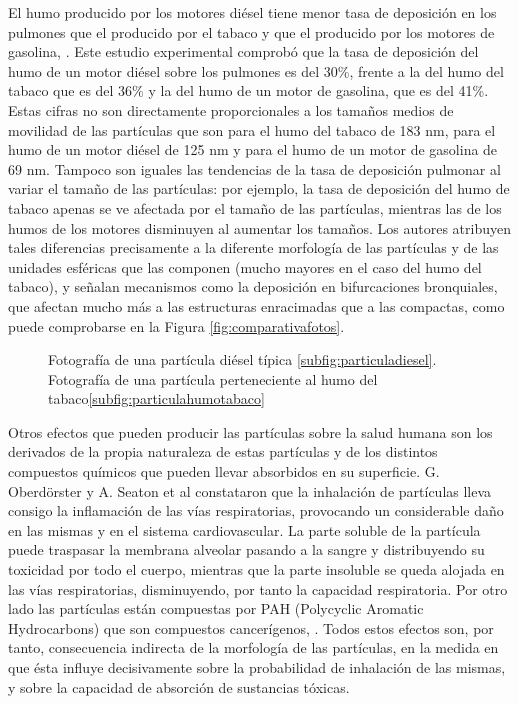 \par El humo producido por los motores diésel tiene menor tasa de deposición en los pulmones que el producido por el tabaco y que el producido por los motores de gasolina, \cite{morawskaetal:1998}. Este estudio experimental comprobó que la tasa de deposición del humo de un motor diésel sobre los pulmones es del 30\%, frente a la del humo del tabaco que es del 36\% y la del humo de un motor de gasolina, que es del 41\%. Estas cifras no son directamente proporcionales a los tamaños medios de movilidad de las partículas que son para el humo del tabaco de 183 nm, para el humo de un motor diésel de 125 nm y para el humo de un motor de gasolina de 69 nm. Tampoco son iguales las tendencias de la tasa de deposición pulmonar al variar el tamaño de las partículas: por ejemplo, la tasa de deposición del humo de tabaco apenas se ve afectada por el tamaño de las partículas, mientras las de los humos de los motores disminuyen al aumentar los tamaños. Los autores atribuyen tales diferencias precisamente a la diferente morfología de las partículas y de las unidades esféricas que las componen (mucho mayores en el caso del humo del tabaco), y señalan mecanismos como la deposición en bifurcaciones bronquiales, que afectan mucho más a las estructuras enracimadas que a las compactas, como puede comprobarse en la Figura \ref{fig:comparativafotos}.
  
\begin{figure}[ht]
\centering
	 \qquad
	 \caption{Fotografía de una partícula diésel típica \ref{subfig:particuladiesel}. Fotografía de una partícula perteneciente al humo del tabaco\ref{subfig:particulahumotabaco}}
\end{figure} \label{fig:comparativafotos}

\par Otros efectos que pueden producir las partículas sobre la salud humana son los derivados de la propia naturaleza de estas partículas y de los distintos compuestos químicos que pueden llevar absorbidos en su superficie. G. Oberdörster \cite{oberdoster:2001} y A. Seaton et al \cite{seatonetal:1995} constataron que la inhalación de partículas lleva consigo la inflamación de las vías respiratorias, provocando un considerable daño en las mismas y en el sistema cardiovascular. La parte soluble de la partícula puede traspasar la membrana alveolar pasando a la sangre y distribuyendo su toxicidad por todo el cuerpo, mientras que la parte insoluble se queda alojada en las vías respiratorias, disminuyendo, por tanto la capacidad respiratoria. Por otro lado las partículas están compuestas por PAH (Polycyclic Aromatic Hydrocarbons) que son compuestos cancerígenos, \cite{benneretal:1990}. Todos estos efectos son, por tanto, consecuencia indirecta de la morfología de las partículas, en la medida en que ésta influye decisivamente sobre la probabilidad de inhalación de las mismas, y sobre la capacidad de absorción de sustancias tóxicas.

